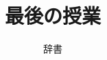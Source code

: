 \documentclass[10pt]{amsart}
\title{最後の授業}
\author{辞書}
\begin{document}
	\maketitle
	\thispagestyle{empty}
	\vspace{1em}
	
	\begin{multicols}{2}\noindent
		
	\end{multicols}
\end{document}

